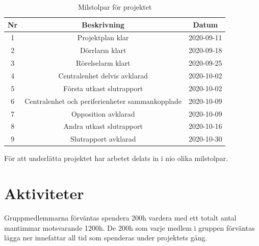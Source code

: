\documentclass[a4paper]{article}
\begin{document}
\begin{table}[H]
    \centering
        \begin{tabular}{ |c|c|c| }\hline
            Nr & Beskrivning & Datum \\\hline\hline
            1 & Projektplan klar & 2020-09-11 \\\hline
            2 & Dörrlarm klart & 2020-09-18 \\\hline
            3 & Rörelselarm klart & 2020-09-25 \\\hline
            4 & Centralenhet delvis avklarad & 2020-10-02 \\\hline
            5 & Första utkast slutrapport & 2020-10-02 \\\hline
            6 & Centralenhet och periferienheter sammankopplade & 2020-10-09 \\\hline
            7 & Opposition avklarad & 2020-10-09 \\\hline
            8 & Andra utkast slutrapport & 2020-10-16 \\\hline
            9 & Slutrapport avklarad & 2020-10-30 \\\hline
        \end{tabular}
        \caption{Milstolpar för projektet}
        \label{table:milstolpar}
\end{table}

För att underlätta projektet har arbetet delats in i nio olika milstolpar.

\section{Aktiviteter}

Gruppmedlemmarna förväntas spendera 200h vardera med ett totalt antal mantimmar motsvarande 1200h. De 200h som varje medlem i gruppen förväntas lägga ner innefattar all tid som spenderas under projektets gång.

\end{document}
